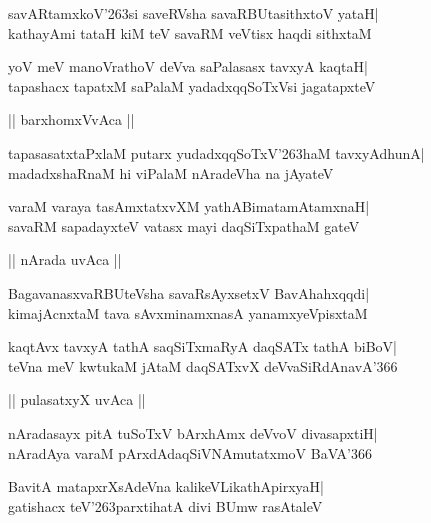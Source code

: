 \documentclass[twoside,12pt,openright]{book}
\def\S{\char'263}
\newcounter{shloka}[chapter]
\begin{document}
\begin{shloka}%
savARtamxkoV\S si saveRVsha savaRBUtasithxtoV yataH|\\
kathayAmi tataH kiM teV savaRM veVtisx haqdi sithxtaM
\end{shloka}

\begin{shloka}%
yoV meV manoVrathoV deVva saPalasasx tavxyA kaqtaH|\\
tapashacx tapatxM saPalaM yadadxqqSoTxVsi jagatapxteV
\end{shloka}

\begin{center}
|| barxhomxVvAca ||
\end{center}
\begin{shloka}%
tapasasatxtaPxlaM putarx yudadxqqSoTxV\S haM tavxyAdhunA|\\
madadxshaRnaM hi viPalaM nAradeVha na jAyateV
\end{shloka}

\begin{shloka}%
varaM varaya tasAmxtatxvXM yathABimatamAtamxnaH|\\
savaRM sapadayxteV vatasx mayi daqSiTxpathaM gateV
\end{shloka}

\begin{center}
|| nArada uvAca ||
\end{center}
\begin{shloka}%
BagavanasxvaRBUteVsha savaRsAyxsetxV BavAhahxqqdi|\\
kimajAcnxtaM tava sAvxminamxnasA yanamxyeVpisxtaM
\end{shloka}

\begin{shloka}%
kaqtAvx tavxyA tathA saqSiTxmaRyA daqSATx tathA biBoV|\\
teVna meV kwtukaM jAtaM daqSATxvX deVvaSiRdAnavA\char'366
\end{shloka}

\begin{center}
|| pulasatxyX uvAca ||
\end{center}
\begin{shloka}%
nAradasayx pitA tuSoTxV bArxhAmx deVvoV divasapxtiH|\\
nAradAya varaM pArxdAdaqSiVNAmutatxmoV BaVA\char'366
\end{shloka}

\begin{shloka}%
BavitA matapxrXsAdeVna kalikeVLikathApirxyaH|\\
gatishacx teV\S parxtihatA divi BUmw rasAtaleV
\end{shloka}
\end{document}
